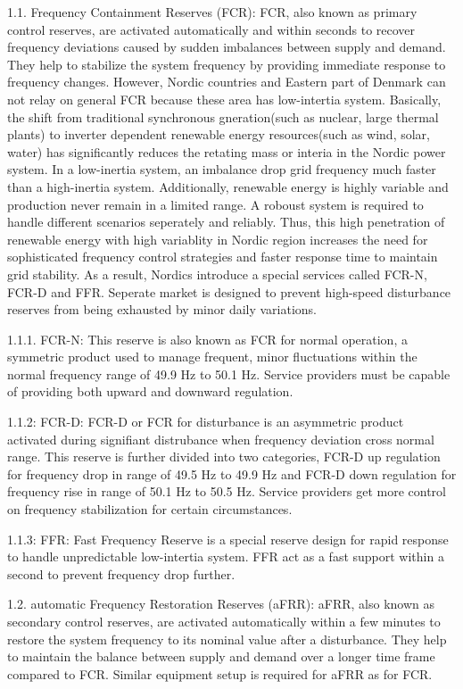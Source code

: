     1.1. Frequency Containment Reserves (FCR): FCR, also known as primary control reserves, are activated automatically and within seconds to recover frequency deviations caused by sudden imbalances between supply and demand. They help to stabilize the system frequency by providing immediate response to frequency changes. However, Nordic countries and Eastern part of Denmark can not relay on general FCR because these area has low-intertia system. Basically, the shift from traditional synchronous gneration(such as nuclear, large thermal plants) to inverter dependent renewable energy resources(such as wind, solar, water) has significantly reduces the retating mass or interia in the Nordic power system. In a low-inertia system, an imbalance drop grid frequency much faster than a high-inertia system. Additionally, renewable energy is highly variable and production never remain in a limited range. A roboust system is required to handle different scenarios seperately and reliably. Thus, this high penetration of renewable energy with high variablity in Nordic region increases the need for sophisticated frequency control strategies and faster response time to maintain grid stability. As a result, Nordics introduce a special services called FCR-N, FCR-D and FFR. Seperate market is designed to prevent high-speed disturbance reserves from being exhausted by minor daily variations. 

        1.1.1. FCR-N: This reserve is also known as FCR for normal operation, a symmetric product used to manage frequent, minor fluctuations within the normal frequency range of 49.9 Hz to 50.1 Hz. Service providers must be capable of providing both upward and downward regulation. 

        1.1.2: FCR-D: FCR-D or FCR for disturbance is an asymmetric product activated during signifiant distrubance when frequency deviation cross normal range. This reserve is further divided into two categories, FCR-D up regulation for frequency drop in range of 49.5 Hz to 49.9 Hz and FCR-D down regulation for frequency rise in range of 50.1 Hz to 50.5 Hz. Service providers get more control on frequency stabilization for certain circumstances. 

        1.1.3: FFR: Fast Frequency Reserve is a special reserve design for rapid response to handle unpredictable low-intertia system. FFR act as a fast support within a second to prevent frequency drop further.

    1.2. automatic Frequency Restoration Reserves (aFRR): aFRR, also known as secondary control reserves, are activated automatically within a few minutes to restore the system frequency to its nominal value after a disturbance. They help to maintain the balance between supply and demand over a longer time frame compared to FCR. Similar equipment setup is required for aFRR as for FCR.

